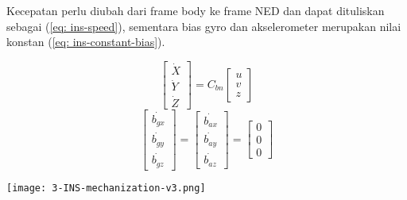 \begin{frame}[allowframebreaks]
    \pagebreak

    Kecepatan perlu diubah dari frame body ke frame NED dan dapat dituliskan sebagai (\ref{eq: ins-speed}), sementara bias gyro dan akselerometer merupakan nilai konstan (\ref{eq: ins-constant-bias}).

    \begin{equation}
        \left[\begin{array}{l}
        \dot{X} \\
        \dot{Y} \\
        \dot{Z}
        \end{array}\right]=C_{b n}\left[\begin{array}{l}
        u \\
        v \\
        z
        \end{array}\right]
        \label{eq: ins-speed}
    \end{equation}
    \begin{equation}
        \left[\begin{array}{c}
        \dot{b_{g x}}\\
        \dot{b_{g y}}\\
        \dot{b_{g z}}
        \end{array}\right]=\left[\begin{array}{l}
        \dot{b_{a x}} \\
        \dot{b_{a y}} \\
        \dot{b_{a z}}
        \end{array}\right]=\left[\begin{array}{l}
            0 \\
            0 \\
            0
        \end{array}\right]
        \label{eq: ins-constant-bias}
    \end{equation}

    \begin{center}
        \texttt{[image: 3-INS-mechanization-v3.png]}
    \end{center}
\end{frame}


